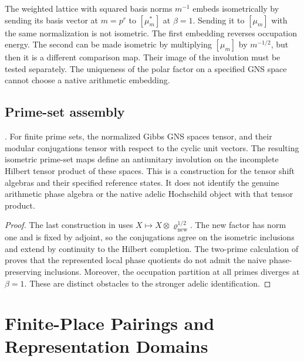 \begin{remark}
\label{v4-arith:kms-gns:rem:uniqueness}
The weighted lattice with squared basis norms $m^{-1}$ embeds
isometrically by sending its basis vector at $m=p^r$ to
$[\mu_m^*]$ at $\beta=1$. Sending it to $[\mu_m]$ with the
same normalization is not isometric. The first embedding reverses
occupation energy. The second can be made isometric by multiplying
$[\mu_m]$ by $m^{-1/2}$, but then it is a different comparison map.
Their image of the involution must be tested separately. The
uniqueness of the polar factor on a specified GNS space cannot
choose a native arithmetic embedding.
\end{remark}

\subsection{Prime-set assembly}
\label{v4-arith:kms-gns:cycle1:adelic}

\begin{corollary}
\label{v4-arith:kms-gns:cor:adelic-KMS-GNS}
\ClaimStatusProvedHere. For finite prime sets, the normalized
Gibbs GNS spaces tensor, and their modular conjugations tensor
with respect to the cyclic unit vectors. The resulting isometric
prime-set maps define an antiunitary involution on the incomplete
Hilbert tensor product of these spaces. This is a construction
for the tensor shift algebras and their specified reference states.
It does not identify the genuine arithmetic phase algebra or the
native adelic Hochschild object with that tensor product.
\end{corollary}

\begin{proof}
The last construction in 
uses $X\mapsto X\otimes\varrho_{\mathrm{new}}^{1/2}$.
The new factor has norm one and is fixed by adjoint, so the
conjugations agree on the isometric inclusions and extend by
continuity to the Hilbert completion. The two-prime calculation
of  proves that the
represented local phase quotients do not admit the naive
phase-preserving inclusions. Moreover, the occupation partition
at all primes diverges at $\beta=1$. These are distinct obstacles
to the stronger adelic identification.
\end{proof}

\section{Finite-Place Pairings and Representation Domains}
\label{v4-arith:kms-gns:cycle2}
\label{v4-arith:kms-gns:cycle2:ramified}

